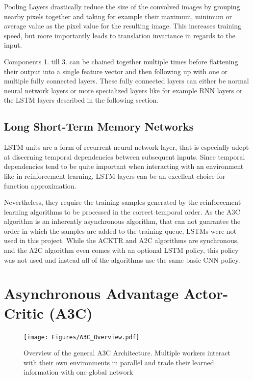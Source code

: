 Pooling Layers drastically reduce the size of the convolved images by grouping nearby pixels together and taking for example their maximum, minimum or average value as the pixel value for the resulting image. This increases training speed, but more importantly leads to translation invariance in regards to the input.

Components 1. till 3. can be chained together multiple times before flattening their output into a single feature vector and then following up with one or multiple fully connected layers. These fully connected layers can either be normal neural network layers or more specialized layers like for example RNN layers or the LSTM layers described in the following section.


\subsection{Long Short-Term Memory Networks}
\label{sec:lstm}
LSTM units \citep{lstm,DBLP:journals/neco/GersSC00} are a form of recurrent neural network layer, that is especially adept at discerning temporal dependencies between subsequent inputs. Since temporal dependencies tend to be quite important when interacting with an environment like in reinforcement learning, LSTM layers can be an excellent choice for function approximation. 

Nevertheless, they require the training samples generated by the reinforcement learning algorithms to be processed in the correct temporal order. As the A3C algorithm is an inherently asynchronous algorithm, that can not guarantee the order in which the samples are added to the training queue, LSTMs were not used in this project. While the ACKTR and A2C algorithms are synchronous, and the A2C algorithm even comes with an optional LSTM policy, this policy was not used and instead all of the algorithms use the same basic CNN policy. 

\section{Asynchronous Advantage Actor-Critic (A3C)}
\label{sec:a3ctheory}
\begin{figure}[htb]
  \centering
      \texttt{[image: Figures/A3C\_Overview.pdf]}
  \caption{ Overview of the general A3C Architecture. Multiple workers interact with their own environments in parallel and trade their learned information with one global network }
  \label{fig:a3cover}
\end{figure}

